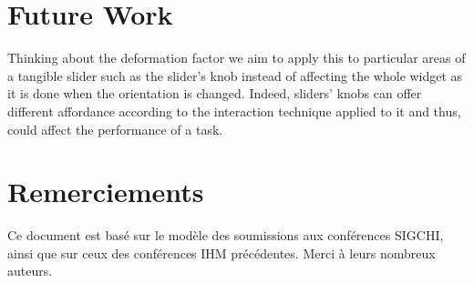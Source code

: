 \documentclass{sigchi}
\begin{document}

\section{Future Work}
Thinking about the deformation factor we aim to apply this to particular areas of a tangible slider  such as the slider’s knob instead of affecting the whole widget as it is done when the orientation is changed. Indeed, sliders’ knobs can offer different affordance according to the interaction technique applied to it and thus, could affect the performance of a task.
\section{Remerciements}
Ce document est bas\'e sur le mod\`ele des soumissions aux conf\'erences SIGCHI, ainsi que sur ceux des conf\'erences IHM pr\'ec\'edentes. Merci \`a leurs nombreux auteurs.
\end{document}
